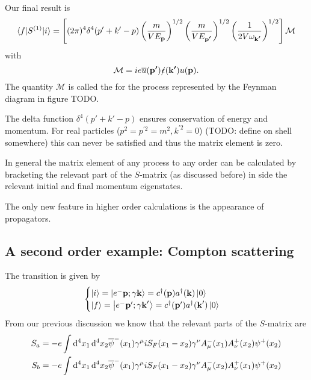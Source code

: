 Our final result is
\[ \braket[S^{(1)}]{f}{i} = \left[(2\pi)^4\delta^4(p'+k'-p)\left(\frac{m}{VE_{\vec{p}}}\right)^{1/2}\left(\frac{m}{VE_{\vec{p'}}}\right)^{1/2}\left(\frac{1}{2V\omega_{\vec{k'}}}\right)^{1/2}\right]\mathcal{M} \]
with
\[ \mathcal{M} = ie\overline{u}(\vec{p'})\slashed{\epsilon}(\vec{k'})u(\vec{p}). \]
The quantity $\mathcal{M}$ is called the  for the process represented by the Feynman diagram in figure TODO.

The delta function $\delta^4(p'+k'-p)$ ensures conservation of energy and momentum. For real particles ($p^2 = p^{\prime 2} = m^2, k^{\prime 2} = 0$) (TODO: define on shell somewhere) this can never be satisfied and thus the matrix element is zero.

In general the matrix element of any process to any order can be calculated by bracketing the relevant part of the $S$-matrix (as discussed before) in side the relevant initial and final momentum eigenstates.

The only new feature in higher order calculations is the appearance of propagators.

\subsection{A second order example: Compton scattering}
The transition is given by
\[ \begin{cases}
\ket{i} = \ket{e^-\vec{p}; \gamma\vec{k}} = c^\dagger(\vec{p})a^\dagger(\vec{k})\ket{0} \\
\ket{f} = \ket{e^-\vec{p}'; \gamma\vec{k}'} = c^\dagger(\vec{p}')a^\dagger(\vec{k}')\ket{0}
\end{cases} \]
From our previous discussion we know that the relevant parts of the $S$-matrix are
\begin{align*}
S_a  &= - e \int \diff{^4x_1}\diff{^4x_2}\overline{\psi}^-(x_1)\gamma^\mu iS_F(x_1-x_2)\gamma^\nu A^-_\mu(x_1)A^+_\nu(x_2)\psi^+(x_2) \\
S_b &= - e \int \diff{^4x_1}\diff{^4x_2}\overline{\psi}^-(x_1)\gamma^\mu iS_F(x_1-x_2)\gamma^\nu A^-_\mu(x_2)A^+_\nu(x_1)\psi^+(x_2)
\end{align*}

